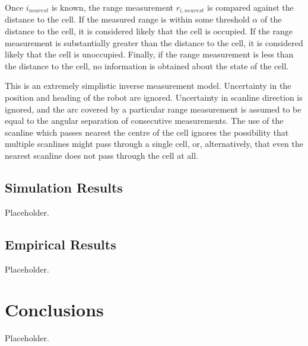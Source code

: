 \documentclass[11pt]{article} %
\begin{document}
Once $i_{nearest}$ is known, the range measurement $r_{i,nearest}$ is compared against the distance to the cell.  If the measured range is within some threshold $\alpha$ of the distance to the cell, it is considered likely that the cell is occupied.  If the range measurement is substantially greater than the distance to the cell, it is considered likely that the cell is unoccupied.  Finally, if the range measurement is less than the distance to the cell, no information is obtained about the state of the cell.

This is an extremely simplistic inverse measurement model.  Uncertainty in the position and heading of the robot are ignored.  Uncertainty in scanline direction is ignored, and the arc covered by a particular range measurement is assumed to be equal to the angular separation of consecutive measurements.  The use of the scanline which passes nearest the centre of the cell ignores the possibility that multiple scanlines might pass through a single cell, or, alternatively, that even the nearest scanline does not pass through the cell at all.  

\subsection{Simulation Results}

Placeholder.

\subsection{Empirical Results}

Placeholder.

\section{Conclusions}

Placeholder.
\end{document}
